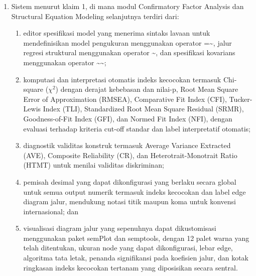 \documentclass[12pt,a4paper]{article}
\begin{document}
\begin{enumerate}[leftmargin=3em, labelsep=1em, itemsep=12pt]
\begin{enumerate}[label=\alph*., leftmargin=2em, itemsep=2pt]
\item modul Confirmatory Factor Analysis (CFA) dan Structural Equation Modeling (SEM) untuk menguji model pengukuran dan struktural yang dihipotesiskan menggunakan kerangka kerja lavaan, mendukung berbagai estimator termasuk ML, MLR, WLSMV, dan ULS;
\item kerangka perbandingan model terstandarisasi yang beroperasi secara konsisten di seluruh modul analitis, menyediakan tabel indeks kecocokan interaktif yang dapat diurutkan dan panduan interpretatif; dan
\item sistem pelaporan otomatis yang menghasilkan dokumen HTML berformat yang memuat interpretasi narasi, tabel berformat APA, dan visualisasi tertanam.
\end{enumerate}

\item Sistem menurut klaim 1, di mana modul Confirmatory Factor Analysis dan Structural Equation Modeling selanjutnya terdiri dari:
\begin{enumerate}[label=\alph*., leftmargin=2em, itemsep=2pt]
\item editor spesifikasi model yang menerima sintaks lavaan untuk mendefinisikan model pengukuran menggunakan operator =\textasciitilde{}, jalur regresi struktural menggunakan operator \textasciitilde{}, dan spesifikasi kovarians menggunakan operator \textasciitilde{}\textasciitilde{};
\item komputasi dan interpretasi otomatis indeks kecocokan termasuk Chi-square ($\chi^2$) dengan derajat kebebasan dan nilai-p, Root Mean Square Error of Approximation (RMSEA), Comparative Fit Index (CFI), Tucker-Lewis Index (TLI), Standardized Root Mean Square Residual (SRMR), Goodness-of-Fit Index (GFI), dan Normed Fit Index (NFI), dengan evaluasi terhadap kriteria cut-off standar dan label interpretatif otomatis;
\item diagnostik validitas konstruk termasuk Average Variance Extracted (AVE), Composite Reliability (CR), dan Heterotrait-Monotrait Ratio (HTMT) untuk menilai validitas diskriminan;
\item pemisah desimal yang dapat dikonfigurasi yang berlaku secara global untuk semua output numerik termasuk indeks kecocokan dan label edge diagram jalur, mendukung notasi titik maupun koma untuk konvensi internasional; dan
\item visualisasi diagram jalur yang sepenuhnya dapat dikustomisasi menggunakan paket semPlot dan semptools, dengan 12 palet warna yang telah ditentukan, ukuran node yang dapat dikonfigurasi, lebar edge, algoritma tata letak, penanda signifikansi pada koefisien jalur, dan kotak ringkasan indeks kecocokan tertanam yang diposisikan secara sentral.
\end{enumerate}


\end{enumerate}
\end{document}
